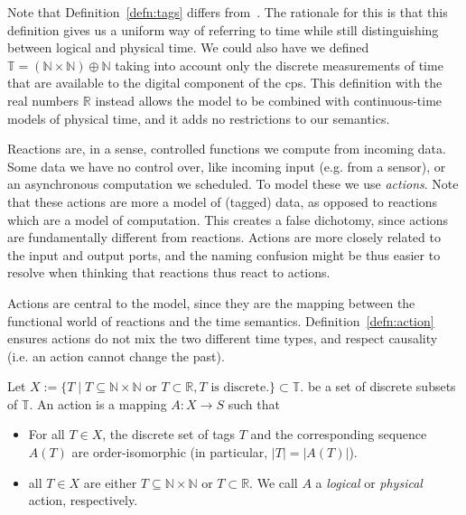 Note that Definition~\ref{defn:tags} differs from~\cite{lohstroh_cyphy19,lohstroh_phdthesis}.
The rationale for this is that this definition gives us a uniform way of referring to time while still distinguishing between logical and physical time.
We could also have we defined $\mathbb{T} = (\mathbb{N} \times \mathbb{N}) \oplus \mathbb{N}$ taking into account only the discrete measurements of time that are available to the digital component of the \ac{cps}.
This definition with the real numbers $\mathbb{R}$ instead allows the model to be combined with continuous-time models of physical time, and it adds no restrictions to our semantics.

Reactions are, in a sense, controlled functions we compute from incoming data. 
Some data we have no control over, like incoming input (e.g. from a sensor), or an asynchronous computation we scheduled.
To model these we use \emph{actions}.
Note that these actions are more a model of (tagged) data, as opposed to reactions which are a model of computation.
This creates a false dichotomy, since actions are fundamentally different from reactions.
Actions are more closely related to the input and output ports, and the naming confusion might be thus easier to resolve when thinking that reactions thus react to actions.

Actions are central to the model, since they are the mapping between the functional world of reactions and the time semantics. 
Definition~\ref{defn:action} ensures actions do not mix the two different time types, and respect causality (i.e. an action cannot change the past).

\begin{defn}
    \label{defn:action}
Let $X := \{ T \mid T \subseteq \mathbb{N} \times \mathbb{N} \text{ or } T \subset \mathbb{R}, T \text{ is discrete.}  \} \subset \mathbb{T}.$ be a set of discrete subsets of $\mathbb{T}$.
An action is a mapping $A : X \rightarrow S$ such that
\begin{itemize}
    \item For all $T \in X$, the discrete set of tags $T$ and the corresponding sequence $A(T)$ are order-isomorphic (in particular, $|T| = |A(T)|$).
    \item all $T \in X$ are either $T \subseteq \mathbb{N} \times \mathbb{N}$ or $T  \subset \mathbb{R}$. We call $A$ a \emph{logical} or \emph{physical} action, respectively.
\end{itemize}
\end{defn}

